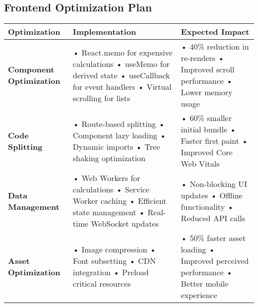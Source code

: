 \documentclass{article}
\begin{document}
\subsection{Frontend Optimization Plan}

\begin{longtable}{|p{}|p{}|p{}|}
\hline
\textbf{Optimization} & \textbf{Implementation} & \textbf{Expected Impact} \\
\hline
\textbf{Component Optimization} & 
• React.memo for expensive calculations \newline
• useMemo for derived state \newline
• useCallback for event handlers \newline
• Virtual scrolling for lists & 
• 40\% reduction in re-renders \newline
• Improved scroll performance \newline
• Lower memory usage \\
\hline
\textbf{Code Splitting} & 
• Route-based splitting \newline
• Component lazy loading \newline
• Dynamic imports \newline
• Tree shaking optimization & 
• 60\% smaller initial bundle \newline
• Faster first paint \newline
• Improved Core Web Vitals \\
\hline
\textbf{Data Management} & 
• Web Workers for calculations \newline
• Service Worker caching \newline
• Efficient state management \newline
• Real-time WebSocket updates & 
• Non-blocking UI updates \newline
• Offline functionality \newline
• Reduced API calls \\
\hline
\textbf{Asset Optimization} & 
• Image compression \newline
• Font subsetting \newline
• CDN integration \newline
• Preload critical resources & 
• 50\% faster asset loading \newline
• Improved perceived performance \newline
• Better mobile experience \\
\hline
\end{longtable}
\end{document}
